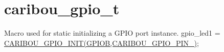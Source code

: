 \hypertarget{caribou_gpio_t-example}{\section{caribou\-\_\-gpio\-\_\-t}
}
Macro used for static initializing a G\-P\-I\-O port instance. gpio\-\_\-led1 = \hyperlink{gpio_8h_a81205bf9142cd9955e4e3e02b1719288}{C\-A\-R\-I\-B\-O\-U\-\_\-\-G\-P\-I\-O\-\_\-\-I\-N\-I\-T(\-G\-P\-I\-O\-B,\-C\-A\-R\-I\-B\-O\-U\-\_\-\-G\-P\-I\-O\-\_\-\-P\-I\-N\-\_)};


\begin{DoxyCodeInclude}
\end{DoxyCodeInclude}
 